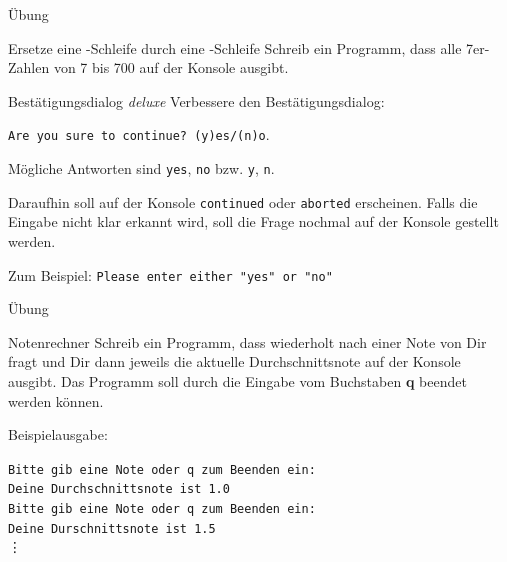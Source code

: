 \begin{frame}{Übung}

\begin{block}{Ersetze eine -Schleife durch eine -Schleife}
\vspace{2pt}
Schreib ein Programm, dass alle 7er-Zahlen von 7 bis 700 auf der Konsole ausgibt.  
\end{block}

\pause 
\vspace{12pt}

\begin{block}{Bestätigungsdialog \emph{deluxe}}
\vspace{2pt}
Verbessere den Bestätigungsdialog:  

\texttt{Are you sure to continue? (y)es/(n)o}. 

Mögliche Antworten sind \texttt{yes}, \texttt{no} bzw. \texttt{y}, \texttt{n}. 

Daraufhin soll auf der Konsole \texttt{continued} oder \texttt{aborted} erscheinen. 
Falls die Eingabe nicht klar erkannt wird, soll die Frage nochmal auf der Konsole gestellt werden. 

Zum Beispiel: 
\texttt{Please enter either "yes"{} or "no"}  
\end{block}

\end{frame}

\begin{frame}{Übung}

\begin{block}{Notenrechner}
\vspace{2pt}
Schreib ein Programm, dass wiederholt nach einer Note von Dir fragt und Dir dann jeweils die aktuelle Durchschnittsnote auf der Konsole ausgibt. 
Das Programm soll durch die Eingabe vom Buchstaben \textbf{q} beendet werden können. 

Beispielausgabe: 

\texttt{Bitte gib eine Note oder q zum Beenden ein:}  \\
\texttt{Deine Durchschnittsnote ist 1.0} \\
\texttt{Bitte gib eine Note oder q zum Beenden ein:}  \\
\texttt{Deine Durschnittsnote ist 1.5} \\
\phantom{Code} \vdots 
	
\end{block}

\end{frame}

